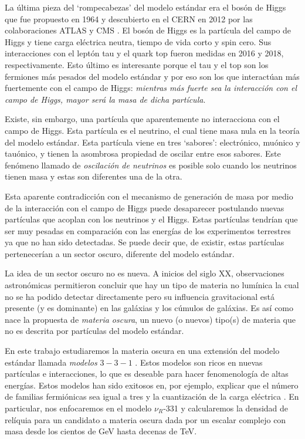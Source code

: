 La última pieza del `rompecabezas' del modelo estándar era el bosón de Higgs que fue propuesto en 1964 y descubierto en el CERN en 2012 por las colaboraciones ATLAS \cite{ATLAS:2012yve} y CMS \cite{CMS:2012qbp}. El bosón de Higgs es la partícula del campo de Higgs y tiene carga eléctrica neutra, tiempo de vida corto y spin cero. Sus interacciones con el leptón tau y el quark top fueron medidas en 2016 y 2018, respectivamente. Esto último es interesante porque el tau y el top son los fermiones más pesados del modelo estándar y por eso son los que interactúan más fuertemente con el campo de Higgs: \textit{mientras más fuerte sea la interacción con el campo de Higgs, mayor será la masa de dicha partícula}.

Existe, sin embargo, una partícula que aparentemente no interacciona con el campo de Higgs. Esta partícula es el neutrino, el cual tiene masa nula en la teoría del modelo estándar. Esta partícula viene en tres `sabores': electrónico, muónico y tauónico, y tienen la asombrosa propiedad de oscilar entre esos sabores. Este fenómeno llamado de \textit{oscilación de neutrinos} es posible solo cuando los neutrinos tienen masa y estas son diferentes una de la otra. 

Esta aparente contradicción con el mecanismo de generación de masa por medio de la interacción con el campo de Higgs puede desaparecer postulando nuevas partículas que acoplan con los neutrinos y el Higgs. Estas partículas tendrían que ser muy pesadas en comparación con las energías de los experimentos terrestres ya que no han sido detectadas. Se puede decir que, de existir, estas partículas pertenecerían a un sector oscuro, diferente del modelo estándar.

La idea de un sector oscuro no es nueva. A inicios del siglo XX, observaciones astronómicas permitieron concluir que hay un tipo de materia no lumínica la cual no se ha podido detectar directamente pero su influencia gravitacional está presente (y es dominante) en las galáxias y los cúmulos de galáxias. Es así como nace la propuesta de \textit{materia oscura}, un nuevo (o nuevos) tipo(s) de materia que no es descrita por partículas del modelo estándar.

En este trabajo estudiaremos la materia oscura en una extensión del modelo estándar llamada \textit{modelos} $3-3-1$ \cite{PhysRevD.46.410}. Estos modelos son ricos en nuevas partículas e interacciones, lo que es deseable para hacer fenomenología de altas energías. Estos modelos han sido exitosos en, por ejemplo, explicar que el número de familias fermiónicas sea igual a tres \cite{Foot:1992rh} y la cuantización de la carga eléctrica \cite{deSousaPires:1998jc}. En particular, nos enfocaremos en el modelo $\nu_R$-331 \cite{Singer:1980sw} y calcularemos la densidad de relíquia para un candidato a materia oscura dada por un escalar complejo con masa desde los cientos de GeV hasta decenas de TeV. 

